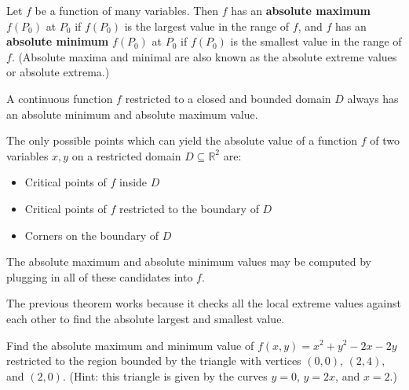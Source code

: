\documentclass[letterpaper, twoside, 12pt]{book}
\begin{document}
          \begin{solution}

          \end{solution}

\begin{definition}
  Let $f$ be a function of many variables.
  Then $f$ has an \textbf{absolute maximum} $f(P_0)$ at $P_0$ if $f(P_0)$ is
  the largest value in the range of $f$, and
  $f$ has an \textbf{absolute minimum} $f(P_0)$ at $P_0$ if $f(P_0)$ is
  the smallest value in the range of $f$.
  (Absolute maxima and minimal are also known as the absolute extreme values or
  absolute extrema.)
\end{definition}

\begin{theorem}
  A continuous function $f$ restricted to a closed and bounded domain $D$
  always has an absolute minimum and absolute maximum value.
\end{theorem}

\begin{theorem}
  The only possible points which can yield the absolute value of a function
  $f$ of two variables $x,y$ on a restricted domain $D\subseteq \mathbb R^2$
  are:
  \begin{itemize}
    \item Critical points of $f$ inside $D$
    \item Critical points of $f$ restricted to the boundary of $D$
    \item Corners on the boundary of $D$
  \end{itemize}
  The absolute maximum and absolute minimum values may be computed by
  plugging in all of these candidates into $f$.
\end{theorem}

\begin{remark}
  The previous theorem works because it checks all the local extreme values
  against each other to find the absolute largest and smallest value.
\end{remark}

          \begin{problem}
            Find the absolute maximum and minimum value of
            $f(x,y)=x^2+y^2-2x-2y$ restricted to the region bounded by
            the triangle with vertices
            $(0,0)$, $(2,4)$, and $(2,0)$. (Hint: this
            triangle is given by the curves $y=0$, $y=2x$, and
            $x=2$.)
          \end{problem}
\end{document}
